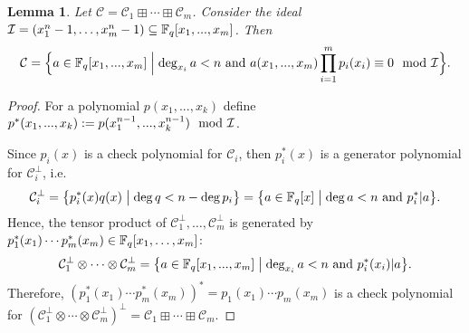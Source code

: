 \documentclass[11pt]{article}
\newtheorem{lemma}{Lemma}
\newcommand{\cC}{\mathcal{C}}
\begin{document}
\begin{lemma}\label{lemma:sum-check}
    Let $\cC=\cC_1\boxplus \cdots\boxplus \cC_m$. Consider the ideal $\mathcal{I}=(x_1^n-1,\ldots,x_m^n-1)\subseteq \mathbb{F}_q[x_1,...,x_m]$. Then
    \begin{equation*}
        \cC = \Bigfbr{a\in \F_q[x_1,...,x_m] \Bigm| \deg_{x_i}a<n \mbox{ \rm and } a(x_1,...,x_m)\prod_{i=1}^m p_i(x_i)\equiv 0 \mod \cI}.
    \end{equation*}
\end{lemma}
\begin{proof}
    For a polynomial $p(x_1,...,x_k)$ define $p^*(x_1,...,x_k):=p(x_1^{n-1},...,x_k^{n-1})\mod {\mathcal{I}}$.
    
    Since $p_i(x)$ is a check polynomial for $\cC_i$, then $p_i^*(x)$ is a generator polynomial for $\cC_i^\bot$, i.e.
    \[
    \cC_i^\bot=\bigfbr{p^*_i(x)q(x)\bigm| \deg q<n-\deg p_i}=\bigfbr{a\in \F_q[x]\bigm| \deg a<n\mbox{ and }p_i^*|a}.
    \]
    Hence, the tensor product of $\cC_1^\bot,\ldots,\cC_m^\bot$ is generated by $p^*_1(x_1)\cdots p^*_m(x_m)\in \mathbb{F}_q[x_1,\ldots,x_m]$:
    \[
    \cC_1^\bot\otimes\cdots\otimes \cC_m^\bot=\bigfbr{a\in \F_q[x_1,...,x_m]\bigm| \deg_{x_i} a<n\mbox{ and }p_i^*(x_i)|a}.
    \]
    Therefore, $(p^*_1(x_1)\cdots p^*_m(x_m))^*=p_1(x_1)\cdots p_m(x_m)$ is a check polynomial for $(\cC_1^\bot\otimes\cdots\otimes \cC_m^\bot)^\bot=\cC_1\boxplus \cdots\boxplus \cC_m$.
\end{proof}
\end{document}
